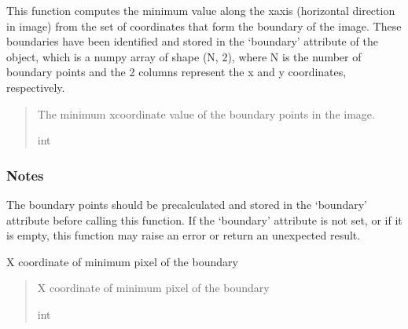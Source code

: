 \documentclass[letterpaper,10pt,english]{sphinxmanual}
\begin{document}
\begin{fulllineitems}
\begin{fulllineitems}
\sphinxAtStartPar
This function computes the minimum value along the x\sphinxhyphen{}axis (horizontal direction in image) from the set of
coordinates that form the boundary of the image. These boundaries have been identified
and stored in the ‘boundary’ attribute of the object, which is a numpy array of shape (N, 2),
where N is the number of boundary points and the 2 columns represent the x and y coordinates, respectively.
\begin{quote}\begin{description}
\sphinxAtStartPar
The minimum x\sphinxhyphen{}coordinate value of the boundary points in the image.

\sphinxAtStartPar
int

\end{description}\end{quote}
\subsubsection*{Notes}

\sphinxAtStartPar
The boundary points should be pre\sphinxhyphen{}calculated and stored in the ‘boundary’ attribute before
calling this function. If the ‘boundary’ attribute is not set, or if it is empty,
this function may raise an error or return an unexpected result.

\end{fulllineitems}


\begin{fulllineitems}
\label{\detokenize{forensicfit.core.tape:forensicfit.core.tape.TapeAnalyzer.xmax}}
\pysigstartsignatures
{}
\pysigstopsignatures
\sphinxAtStartPar
X coordinate of minimum pixel of the boundary
\begin{quote}\begin{description}
\sphinxAtStartPar
{} \textendash{} X coordinate of minimum pixel of the boundary

\sphinxAtStartPar
int

\end{description}\end{quote}


\end{fulllineitems}
\end{fulllineitems}
\end{document}
